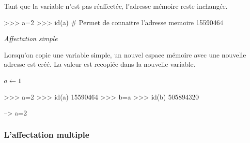 \documentclass[11pt,oneside]{article}
\begin{document}
Tant que la variable n'est pas réaffectée, l'adresse mémoire reste inchangée.

\begin{rem}
\begin{minipage}[c]{.55\linewidth}
\begin{py}
\begin{python}
>>> a=2
>>> id(a) # Permet de connaitre l'adresse memoire
    15590464
\end{python}
\end{py}
\end{minipage}
\end{rem}




\begin{exemple}

\textit{Affectation simple}

Lorsqu'on copie une variable simple, un nouvel espace mémoire avec une nouvelle adresse est créé. La valeur est recopiée dans la nouvelle variable.

\begin{minipage}[c]{.3\linewidth}
\begin{pseudo}
\begin{algorithm}[H]
$a \gets 1$
\end{algorithm}
\end{pseudo}
\end{minipage}\hfill
\begin{minipage}[c]{.3\linewidth}
\begin{py}
\begin{python}
>>> a=2
>>> id(a) 
    15590464
>>> b=a
>>> id(b) 
    505894320
\end{python}
\end{py}
\end{minipage}\hfill
\begin{minipage}[c]{.3\linewidth}
\begin{sci}
\begin{scilab}
--> a=2
\end{scilab}
\end{sci}
\end{minipage}

\end{exemple}

\subsubsection{L'affectation multiple}
\end{document}
